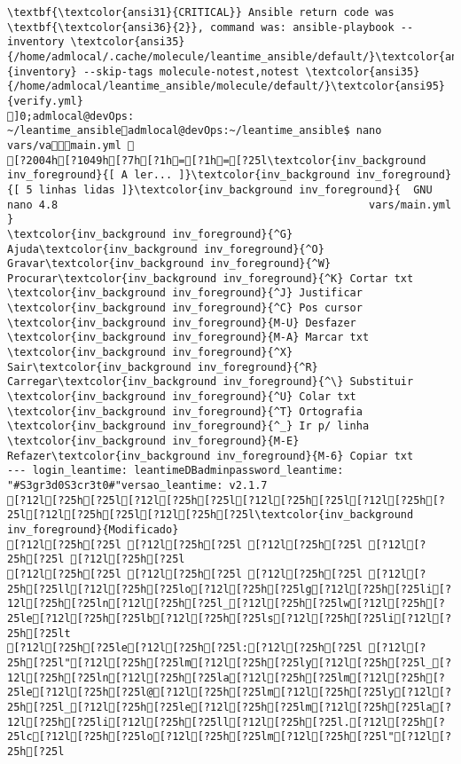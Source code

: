 \documentclass{scrartcl}
\begin{document}
\begin{Verbatim}
\textbf{\textcolor{ansi31}{CRITICAL}} Ansible return code was \textbf{\textcolor{ansi36}{2}}, command was: ansible-playbook --inventory \textcolor{ansi35}{/home/admlocal/.cache/molecule/leantime_ansible/default/}\textcolor{ansi95}{inventory} --skip-tags molecule-notest,notest \textcolor{ansi35}{/home/admlocal/leantime_ansible/molecule/default/}\textcolor{ansi95}{verify.yml}
]0;admlocal@devOps: ~/leantime_ansibleadmlocal@devOps:~/leantime_ansible$ nano vars/vamain.yml 
[?2004h[?1049h[?7h[?1h=[?1h=[?25l\textcolor{inv_background inv_foreground}{[ A ler... ]}\textcolor{inv_background inv_foreground}{[ 5 linhas lidas ]}\textcolor{inv_background inv_foreground}{  GNU nano 4.8                                                 vars/main.yml                                                              }
\textcolor{inv_background inv_foreground}{^G} Ajuda\textcolor{inv_background inv_foreground}{^O} Gravar\textcolor{inv_background inv_foreground}{^W} Procurar\textcolor{inv_background inv_foreground}{^K} Cortar txt    \textcolor{inv_background inv_foreground}{^J} Justificar    \textcolor{inv_background inv_foreground}{^C} Pos cursor    \textcolor{inv_background inv_foreground}{M-U} Desfazer     \textcolor{inv_background inv_foreground}{M-A} Marcar txt
\textcolor{inv_background inv_foreground}{^X} Sair\textcolor{inv_background inv_foreground}{^R} Carregar\textcolor{inv_background inv_foreground}{^\} Substituir    \textcolor{inv_background inv_foreground}{^U} Colar txt     \textcolor{inv_background inv_foreground}{^T} Ortografia    \textcolor{inv_background inv_foreground}{^_} Ir p/ linha   \textcolor{inv_background inv_foreground}{M-E} Refazer\textcolor{inv_background inv_foreground}{M-6} Copiar txt
--- login_leantime: leantimeDBadminpassword_leantime: "#S3gr3d0S3cr3t0#"versao_leantime: v2.1.7
[?12l[?25h[?25l[?12l[?25h[?25l[?12l[?25h[?25l[?12l[?25h[?25l[?12l[?25h[?25l[?12l[?25h[?25l\textcolor{inv_background inv_foreground}{Modificado}
[?12l[?25h[?25l [?12l[?25h[?25l [?12l[?25h[?25l [?12l[?25h[?25l [?12l[?25h[?25l
[?12l[?25h[?25l [?12l[?25h[?25l [?12l[?25h[?25l [?12l[?25h[?25ll[?12l[?25h[?25lo[?12l[?25h[?25lg[?12l[?25h[?25li[?12l[?25h[?25ln[?12l[?25h[?25l_[?12l[?25h[?25lw[?12l[?25h[?25le[?12l[?25h[?25lb[?12l[?25h[?25ls[?12l[?25h[?25li[?12l[?25h[?25lt
[?12l[?25h[?25le[?12l[?25h[?25l:[?12l[?25h[?25l [?12l[?25h[?25l"[?12l[?25h[?25lm[?12l[?25h[?25ly[?12l[?25h[?25l_[?12l[?25h[?25ln[?12l[?25h[?25la[?12l[?25h[?25lm[?12l[?25h[?25le[?12l[?25h[?25l@[?12l[?25h[?25lm[?12l[?25h[?25ly[?12l[?25h[?25l_[?12l[?25h[?25le[?12l[?25h[?25lm[?12l[?25h[?25la[?12l[?25h[?25li[?12l[?25h[?25ll[?12l[?25h[?25l.[?12l[?25h[?25lc[?12l[?25h[?25lo[?12l[?25h[?25lm[?12l[?25h[?25l"[?12l[?25h[?25l

\end{Verbatim}
\end{document}
